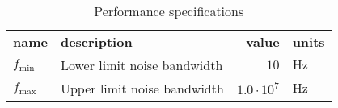\begin{table}[H]
\centering
\begin{tabular}[c]{llrl}
\textbf{name} & \textbf{description} & \textbf{value} & \textbf{units} \\ 
\rowcolor{myyellow}
$f_{\mathrm{min}}$ &\small{Lower limit noise bandwidth} &$10$ &$\mathrm{Hz}$ \\ 
$f_{\mathrm{max}}$ &\small{Upper limit noise bandwidth} &$1.0 \cdot 10^{7}$ &$\mathrm{Hz}$ \\ 
\end{tabular}
\caption{Performance specifications}
\label{tab-performance}
\end{table}


